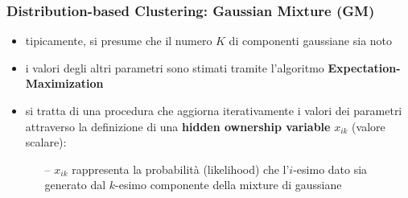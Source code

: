 \begin{frame}

	\frametitle{{\color{GradientDescentDiagramOrange}Distribution-based Clustering}: Gaussian Mixture (GM)}



		\begin{itemize}
			\item tipicamente, si presume che il numero $K$ di componenti gaussiane sia noto
			\item i valori degli altri parametri sono stimati tramite l'algoritmo \textbf{Expectation-Maximization}
			\item si tratta di una procedura che aggiorna iterativamente i valori dei parametri attraverso la definizione di una \textbf{hidden ownership variable} $x_{ik}$ (valore scalare):
				\begin{itemize}
					\item[--] $x_{ik}$ rappresenta la probabilità (likelihood) che l'$i$-esimo dato sia generato dal $k$-esimo componente della mixture di gaussiane
				\end{itemize}

		\end{itemize}

\end{frame}


